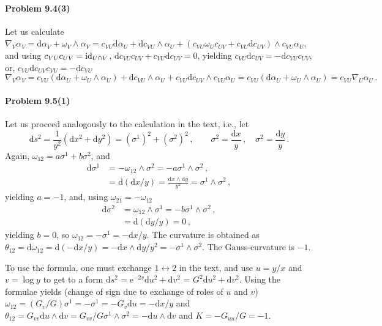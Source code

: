 \documentclass[a4paper,12pt]{article}
\def\d{\mathrm{d}}
\def\e{\mathrm{e}}
\newcommand{\problem}[1]{\paragraph{Problem #1}}
\begin{document}

\problem{9.4(3)} Let us calculate $\nabla_V \alpha_V = \d \alpha_V + \omega_V \wedge \alpha_V = c_{VU}\d\alpha_U + \d c_{VU}\wedge \alpha_U + (c_{VU}\omega_U c_{UV} + c_{VU}\d c_{UV})\wedge c_{VU}\alpha_U$, and using $c_{VU}c_{UV}= {\rm id}_{U\cap V}$, $\d c_{VU}c_{UV}+c_{VU}\d c_{UV}= 0$, yielding $c_{VU}\d c_{UV} = -\d c_{VU} c_{UV}$, or, $c_{VU}\d c_{UV} c_{VU} = -\d c_{VU}$
\[
 \nabla_V \alpha_V = c_{VU}(\d\alpha_U + \omega_U \wedge \alpha_U) + \d c_{VU}\wedge \alpha_U + c_{VU}\d c_{UV} \wedge c_{VU}\alpha_U = c_{VU}(\d\alpha_U + \omega_U \wedge \alpha_U) = c_{VU}\nabla_U\alpha_U\,.
\]


\problem{9.5(1)}\label{pbm:951} Let us proceed analogously to the calculation in the text, i.e., let
\[
 \d s^2 = \frac{1}{y^2}(\d x^2 + \d y^2) = (\sigma^1)^2 + (\sigma^2)^2\,,\quad\quad \sigma^2 = \frac{\d x}{y}\,,\quad \sigma^2 = \frac{\d y}{y}\,.
\]
Again, $\omega_{12} = a \sigma^1 + b \sigma^2$, and
\[
 \begin{aligned}
  \d \sigma^1 &= -\omega_{12} \wedge \sigma^2 = -a \sigma^1\wedge\sigma^2\,,\\
              &= \d(\d x / y) = \frac{\d x\wedge\d y}{y^2} = \sigma^1 \wedge \sigma^2\,,
 \end{aligned}
\]
yielding $a=-1$, and, using $\omega_{21}=-\omega_{12}$
\[
 \begin{aligned}
  \d \sigma^2 &= \omega_{12} \wedge \sigma^1 = -b \sigma^1\wedge \sigma^2\,,\\
              &= \d(\d y / y) = 0\,,
 \end{aligned}
\]
yielding $b=0$, so $\omega_{12} = -\sigma^1 = -\d x/y$.
The curvature is obtained as $\theta_{12}=\d \omega_{12} = \d(-\d x/y) = -\d x\wedge\d y/y^2=-\sigma^1\wedge\sigma^2$. The Gauss-curvature is $-1$.

To use the formula, one must exchange $1\leftrightarrow 2$ in the text, and use $u=y/x$ and $v=\log y$ to get to a form $\d s^2 = \e^{-2v}\d u^2 + \d v^2$ = $G^2\d u^2 +\d v^2$. Using the formulae yields (change of sign due to exchange of roles of $u$ and $v$) $\omega_{12} = (G_v/G)\sigma^1 = -\sigma^1 = -G_v\d u = -\d x/y$ and $\theta_{12} = G_{vv}\d u \wedge \d v =  G_{vv}/G \sigma^1\wedge \sigma^2 = -\d u\wedge \d v$ and $K=-G_{uu}/G = -1$.

\end{document}
